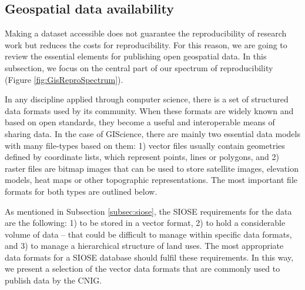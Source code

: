 \documentclass[ijgi,article,submit,moreauthors,pdftex]{Definitions/mdpi}
\begin{document}
\subsection{Geospatial data availability}
\label{sec:data}

Making a dataset accessible does not guarantee the reproducibility of research work but reduces the costs for reproducibility. For this reason, we are going to review the essential elements for publishing open geospatial data. In this subsection, we focus on the central part of our spectrum of reproducibility (Figure \ref{fig:GisReproSpectrum}).

In any discipline applied through computer science, there is a set of structured data formats used by its community. When these formats are widely known and based on open standards, they become a useful and interoperable means of sharing data. In the case of GIScience, there are mainly two essential data models with many file-types based on them: 1) vector files usually contain geometries defined by coordinate lists, which represent points, lines or polygons, and 2) raster files are bitmap images that can be used to store satellite images, elevation models, heat maps or other topographic representations. The most important file formats for both types are outlined below.

As mentioned in Subsection \ref{subsec:siose}, the SIOSE requirements for the data are the following: 1) to be stored in a vector format, 2) to hold a considerable volume of data -- that could be difficult to manage within specific data formats, and 3) to manage a hierarchical structure of land uses. The most appropriate data formats for a SIOSE database should fulfil these requirements. In this way, we present a selection of the vector data formats that are commonly used to publish data by the CNIG.
\end{document}
